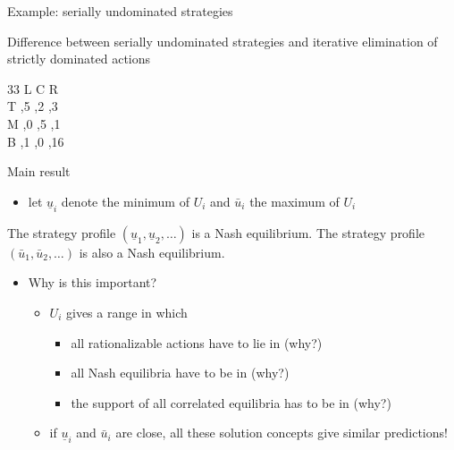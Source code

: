 \documentclass[bigger]{beamer}
\begin{document}
\begin{frame}[label={sec:orgheadline8}]{Example: serially undominated strategies}
\begin{block}{Difference between serially undominated strategies and iterative elimination of strictly dominated actions}
\begin{table}[h]
\centering
 \begin{game}{3}{3}
       \> L \> C   \>  R\\ 
T   ,5  ,2  ,3  \\
M   ,0   ,5   ,1 \\
B   ,1   ,0    ,16  
\end{game}
\end{table}
\end{block}
\end{frame}

\begin{frame}[label={sec:orgheadline9}]{Main result}
\begin{itemize}
\item let  \(\underline u_i\) denote the minimum of \(U_i\) and  \(\bar u_i\) the maximum of \(U_i\)
\end{itemize}
\begin{theorem}
The strategy profile \((\underline u_1,\underline u_2,\dots)\) is a Nash equilibrium. The strategy profile \((\bar u_1,\bar u_2,\dots)\) is also a Nash equilibrium.
\end{theorem}
\begin{itemize}
\item Why is this important?
\begin{itemize}
\item \(U_i\) gives a range in which
\begin{itemize}
\item all rationalizable actions have to lie in (why?)
\item all Nash equilibria have to be in (why?)
\item the support of all correlated equilibria has to be in (why?)
\end{itemize}
\item if \(\underline u_i\) and \(\bar u_i\) are close, all these solution concepts give similar predictions!
\end{itemize}
\end{itemize}
\end{frame}
\end{document}
